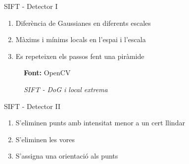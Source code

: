 \documentclass[xcolor=table, 11pt]{beamer}
\newcommand*{\captionsource}[2]{%
  \caption[{#1}]{#1}\par
  \vspace{-0.4cm}
  \tiny{\textbf{Font:} #2\par}}
\newcommand\tz{\fontsize{13}{15.6}\selectfont}
\begin{document}
	\begin{frame}{SIFT - Detector I}
		\tz
		\begin{enumerate}
			\item{Diferència de Gaussianes en diferents escales}
			\item{Màxims i mínims locals en l'espai i l'escala}
			\item{Es repeteixen els passos fent una piràmide}
			\setcounter{enumTemp}{\theenumi}
		\end{enumerate}
		\begin{figure}[H]
			\begin{center}
			\captionsource{\textit{SIFT - DoG i \textit{local extrema}}}{OpenCV}
			\end{center}
		\end{figure}
	\end{frame}

	\begin{frame}{SIFT - Detector II}
		\tz
		\begin{enumerate}
			\setcounter{enumi}{\theenumTemp}
			\item{S'eliminen punts amb intensitat menor a un cert llindar}
			\item{S'eliminen les vores}
			\item{S'assigna una orientació als punts}
		\end{enumerate}
	\end{frame}
\end{document}
